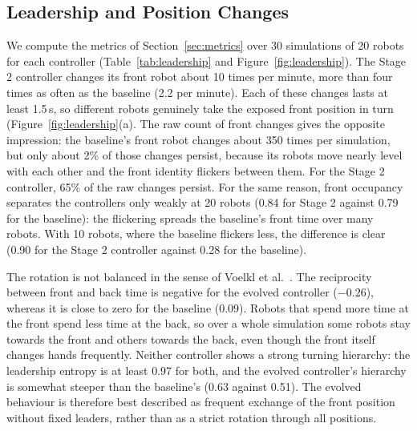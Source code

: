\documentclass[runningheads]{llncs}
\begin{document}
\subsection{Leadership and Position Changes}
\label{sec:leadership_results}




We compute the metrics of Section~\ref{sec:metrics} over 30 simulations of 20 robots for each controller (Table~\ref{tab:leadership} and Figure~\ref{fig:leadership}). The Stage 2 controller changes its front robot about 10 times per minute, more than four times as often as the baseline
(2.2 per minute). Each of these changes lasts at least 1.5\,s, so different robots genuinely take the exposed front position in turn (Figure~\ref{fig:leadership}(a). The raw count of front changes gives the opposite impression: the baseline's front robot changes about 350 times per simulation, but only about 2\% of those changes persist, because its robots move nearly level with each other and the front identity flickers between them. For the Stage 2 controller, 65\% of the raw changes persist. For the same reason, front occupancy separates the controllers only weakly at 20 robots (0.84 for Stage 2 against 0.79 for the baseline): the flickering spreads the baseline's front time over many robots. With 10 robots, where the baseline flickers less, the difference is clear (0.90 for the Stage 2 controller against 0.28 for the baseline).

The rotation is not balanced in the sense of Voelkl et al.~\cite{voelkl2015}. The reciprocity between front and back time is negative for the evolved controller ($-0.26$), whereas it is close to zero for the baseline ($0.09$). Robots that spend more time at the front spend less time at the back, so over a whole simulation some robots stay towards the front and others towards the back, even though the front itself changes hands frequently. Neither controller shows a strong turning hierarchy: the leadership entropy is at least 0.97 for both, and the evolved controller's hierarchy is somewhat
steeper than the baseline's (0.63 against 0.51). The evolved behaviour is therefore best described as frequent exchange of the front position without fixed leaders, rather than as a strict rotation through all positions.
\end{document}
